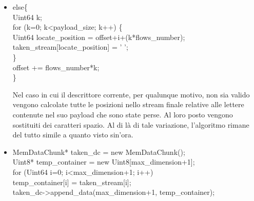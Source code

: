 \begin{itemize}
\begin{notabene}
\end{notabene}
Se il descrittore corrente viene ritenuto valido all'interno del Multiple Description Stream si passa alla decodifica. Viene prelevato il payload e trasferito in una struttura dati in memoria (un Memory DataChunk). Il contenitore temporaneo dello stream decodificato viene ridimensionato per contenere (potenzialmente) tutti i payload provenienti da tutti i descrittori. \`E possibile raggiungere la dimensione massima esclusivamente nel caso in cui non vi sia alcun errore. A questo punto si comincia a prelevare le singole lettere dalla struttura dati in memoria. Se la lettera estratta ha un codice ascii diverso da ``\emph{0}'' si passa al calcolo della sua posizione assoluta all'interno dello stream finale (decodificato) e al posizionamento del carattere corrente in tale posizione. Infine viene aggiornato un contatore che tiene conto della massima posizione riempita in tale fase. Tale contatore servir\`a in una fase successiva e verr\`a descritto in seguito il suo significato.
 \item \begin{code}
else\{\\
Uint64 k;\\
for (k=0; k<payload\_size; k++) \{\\
Uint64 locate\_position = offset+i+(k*flows\_number);\\
taken\_stream[locate\_position] = ' ';\\
\}\\
offset += flows\_number*k;\\
\}\\
\end{code}
Nel caso in cui il descrittore corrente, per qualunque motivo, non sia valido vengono calcolate tutte le posizioni nello stream finale relative alle lettere contenute nel suo payload che sono state perse. Al loro posto vengono sostituiti dei caratteri spazio. Al di l\`a di tale variazione, l'algoritmo rimane del tutto simile a quanto visto sin'ora.
 \item \begin{code}
MemDataChunk* taken\_dc = new MemDataChunk();\\
Uint8* temp\_container = new Uint8[max\_dimension+1];\\
for (Uint64 i=0; i<max\_dimension+1; i++)\\
temp\_container[i] = taken\_stream[i];\\
taken\_dc->append\_data(max\_dimension+1, temp\_container);\\

\end{code}
\end{itemize}
